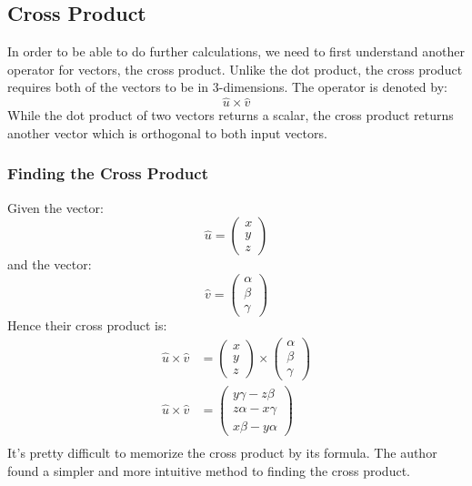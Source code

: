 \documentclass[hidelinks, a4paper, 12pt]{article}
\newcommand{\n}{\\[\baselineskip]}
\begin{document}
        \subsection{Cross Product}
            In order to be able to do further calculations, we need to first understand another operator for vectors, the cross product. Unlike the dot product, the cross
            product requires both of the vectors to be in 3-dimensions. The operator is denoted by:
            \[\hat{u}\times\hat{v}\]
            While the dot product of two vectors returns a scalar, the cross product returns another vector which is orthogonal to both input vectors.
            \subsubsection{Finding the Cross Product}
                Given the vector:
                \[\hat{u} = \begin{pmatrix} x \\ y \\ z \end{pmatrix}\]
                and the vector:
                \[\hat{v} = \begin{pmatrix} \alpha \\ \beta \\ \gamma \end{pmatrix}\]
                Hence their cross product is:
                \[
                    \begin{split}
                        \hat{u}\times\hat{v} &= \begin{pmatrix} x \\ y \\ z \end{pmatrix} \times \begin{pmatrix} \alpha \\ \beta \\ \gamma \end{pmatrix}\\
                        \hat{u}\times\hat{v} &= \begin{pmatrix} y\gamma - z\beta \\ z\alpha - x\gamma \\ x\beta - y\alpha \end{pmatrix}\\
                    \end{split}
                \]
                It's pretty difficult to memorize the cross product by its formula. The author found a simpler and more intuitive method to finding the cross product.\n
\end{document}
